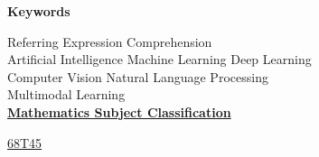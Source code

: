 \begin{center}


  \bigskip\smallskip
  \textbf{Keywords}

  Referring Expression Comprehension\\
  Artificial Intelligence \textbullet{} Machine Learning \textbullet{} Deep
  Learning\\
  Computer Vision \textbullet{} Natural Language Processing\\
  Multimodal Learning\\

  \bigskip
  \href{https://mathscinet.ams.org/msc/msc2010.html}{\textbf{Mathematics
      Subject Classification}}

  \href{https://mathscinet.ams.org/msc/msc2010.html?t=68Txx}{68T45}
\end{center}

\vfill\null{}


\clearpage
\thispagestyle{plain}
\null\vfill

